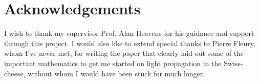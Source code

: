 \chapter*{\centering Acknowledgements}


I wish to thank my supervisor Prof. Alan Heavens for his guidance and support through this project. I would also like to extend special thanks to Pierre Fleury, whom I've never met, for writing the paper that clearly laid out some of the important mathematics to get me started on light propagation in the Swiss-cheese, without whom I would have been stuck for much longer. 